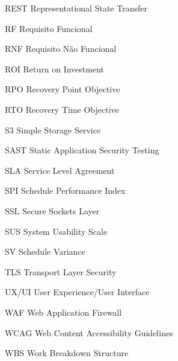 \begin{siglas}
    \item[REST] Representational State Transfer
    \item[RF] Requisito Funcional
    \item[RNF] Requisito Não Funcional
    \item[ROI] Return on Investment
    \item[RPO] Recovery Point Objective
    \item[RTO] Recovery Time Objective
    \item[S3] Simple Storage Service
    \item[SAST] Static Application Security Testing
    \item[SLA] Service Level Agreement
    \item[SPI] Schedule Performance Index
    \item[SSL] Secure Sockets Layer
    \item[SUS] System Usability Scale
    \item[SV] Schedule Variance
    \item[TLS] Transport Layer Security
    \item[UX/UI] User Experience/User Interface
    \item[WAF] Web Application Firewall
    \item[WCAG] Web Content Accessibility Guidelines
    \item[WBS] Work Breakdown Structure
\end{siglas}

